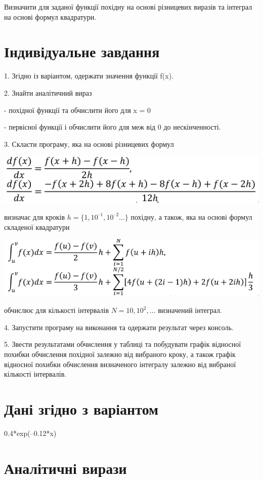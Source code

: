 \documentclass[a4paper, 12pt, oneside]{extarticle}
\renewcommand\Variant{0.4*exp(–0.12*x)}
\newcommand\tcobx[1]{
\begin{tcolorbox}[breakable, arc=0mm, colback=white, boxrule=0.2mm, beforeafter skip=0pt]
	#1
\end{tcolorbox}
}
\begin{document}
\Margins


\tcobx{
Визначити для заданої функції похідну на основі різницевих виразів та інтеграл на основі формул
квадратури.
}

\section*{Індивідуальне завдання}
\tcobx{

1. Згідно із варіантом, одержати значення функції f(x).

2. Знайти аналітичний вираз

- похідної функції та обчислити його для x = 0

- первісної функції і обчислити його для меж від 0 до нескінченності.

3. Скласти програму, яка на основі різницевих формул

	\includegraphics[width=.6\textwidth]{img/f1.png}

	визначає для кроків $h = \{1, 10^{–1}, 10^{–2} …\}$ похідну, а також, яка на основі формул складеної квадратури

	\includegraphics[width=.7\textwidth]{img/f2.png}

	обчислює для кількості інтервалів $N = {10, 10^2, …}$ визначений інтеграл.

4. Запустити програму на виконання та одержати результат через консоль.

5. Звести результатами обчислення у таблиці та побудувати графік відносної похибки обчислення
похідної залежно від вибраного кроку, а також графік відносної похибки обчислення визначеного
інтегралу залежно від вибраної кількості інтервалів.
}

\section*{Дані згідно з варіантом}

\tcobx{
	\Variant
}

\section*{ Аналітичні вирази }
\end{document}
